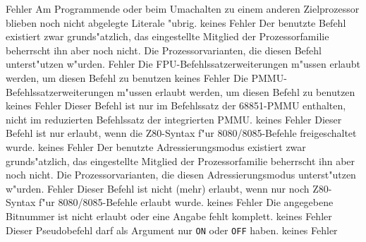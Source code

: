 \documentclass[12pt,a4paper,twoside]{report}
\newcommand{\tty}[1]{{\tt #1}}
\begin{document}
\begin{description}
               {Fehler}
               {Am Programmende oder beim Umachalten
                zu einem anderen Zielprozessor blieben noch nicht
                abgelegte Literale "ubrig.}
               {keines}
               {Fehler}
               {Der benutzte Befehl existiert zwar
                grunds"atzlich, das eingestellte Mitglied der
                Prozessorfamilie beherrscht ihn aber noch nicht.}
               {Die Prozessorvarianten, die diesen Befehl
                unterst"utzen w"urden.}
               {Fehler}
               {Die FPU-Befehlssatzerweiterungen m"ussen erlaubt
                werden, um diesen Befehl zu benutzen}
               {keines}
               {Fehler}
               {Die PMMU-Befehlssatzerweiterungen m"ussen erlaubt
                werden, um diesen Befehl zu benutzen}
               {keines}
               {Fehler}
               {Dieser Befehl ist nur im Befehlssatz der 
                68851-PMMU enthalten, nicht im reduzierten
                Befehlssatz der integrierten PMMU.}
               {keines}
               {Fehler}
               {Dieser Befehl ist nur erlaubt, wenn die
                Z80-Syntax f"ur 8080/8085-Befehle freigeschaltet
                wurde.}
               {keines}
               {Fehler}
               {Der benutzte Adressierungsmodus existiert
                zwar grunds"atzlich, das eingestellte Mitglied der
                Prozessorfamilie beherrscht ihn aber noch nicht.}
               {Die Prozessorvarianten, die diesen
                Adressierungsmodus unterst"utzen w"urden.}
               {Fehler}
               {Dieser Befehl ist nicht (mehr) erlaubt, wenn nur
                noch Z80-Syntax f"ur 8080/8085-Befehle erlaubt
                wurde.}
               {keines}
               {Fehler}
               {Die angegebene Bitnummer ist nicht erlaubt
	        oder eine Angabe fehlt komplett.}
               {keines}
               {Fehler}
               {Dieser Pseudobefehl darf als Argument nur \tty{ON}
                oder \tty{OFF} haben.}
               {keines}
               {Fehler}

\end{description}
\end{document}

